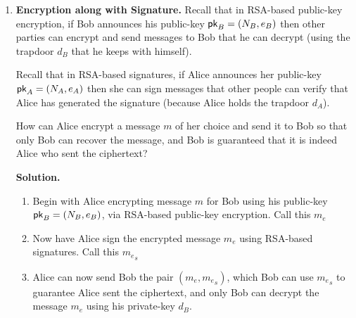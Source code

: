 \documentclass[11pt]{article}
\newcommand{\nextoddpage}{\checkoddpage\ifoddpage{\ \newpage\ \newpage}\else{\ \newpage}\fi}
\begin{document}
\begin{enumerate}
  Now, we want to do this for the Sophie-Germain primes. 
  We shall rely on the conjecture that there are $\frac N{\log^2 N}$ Sophie-Germain primes $<N$. 
  \begin{enumerate}
  \item How many Sophie-Germain primes need $n$-bits in their binary representation? 
  \item Construct an algorithm that that as input $(n,t)$ and outputs a random $n$-bit Sophie-Germain prime with probability $\geq (1-2^{-t})$. 
  \end{enumerate} 
  
  {\bfseries Solution.} 
  \begin{enumerate}
  \item Given that there are $\frac N{\log^2 N}$ Sophie-Germain primes < N, we can determine the number of Sophie-Germain primes with exactly N-bits by using this equation and subtracting the number of Sophie-Germain primes with exactly (N-1)-bits.
 	$$\frac N{\log^2 N} - \frac {N/2}{\log^2 N/2}$$
 	Where N is the largest n-bit prime number.
  \item Since the probability of finding an n-bit prime number is $\geq (1-2^{-t})$, by selecting a random (n+1)-bit number, subtracting 1, and dividing by 2, such that the result is an n-bit number, will result in selecting a Sophie-Germain prime with probability $\geq (1-2^{-t})$.
  \end{enumerate}  
   
  
\nextoddpage 
\item {\bfseries Encryption along with Signature.}
  Recall that in RSA-based public-key encryption, if Bob announces his public-key $\mathsf{pk}_B = (N_B,e_B)$ then other parties can encrypt and send messages to Bob that he can decrypt (using the trapdoor $d_B$ that he keeps with himself). 
  
  Recall that in RSA-based signatures, if Alice announces her public-key $\mathsf{pk}_A=(N_A,e_A)$ then she can sign messages that other people can verify that Alice has generated the signature (because Alice holds the trapdoor $d_A$). 
  
  How can Alice encrypt a message $m$ of her choice and send it to Bob so that only Bob can recover the message, and Bob is guaranteed that it is indeed Alice who sent the ciphertext?
  
  {\bfseries Solution.} 
  \begin{enumerate}
  \item Begin with Alice encrypting message $m$ for Bob using his public-key $\mathsf{pk}_B = (N_B,e_B)$, via RSA-based public-key encryption. Call this $m_e$
  \item Now have Alice sign the encrypted message $m_e$ using RSA-based signatures. Call this ${m_e}_s$
  \item Alice can now send Bob the pair $(m_e, {m_e}_s)$, which Bob can use ${m_e}_s$ to guarantee Alice sent the ciphertext, and only Bob can decrypt the message $m_e$ using his private-key $d_B$.
  \end{enumerate}  
  

\end{enumerate}
\end{document}
